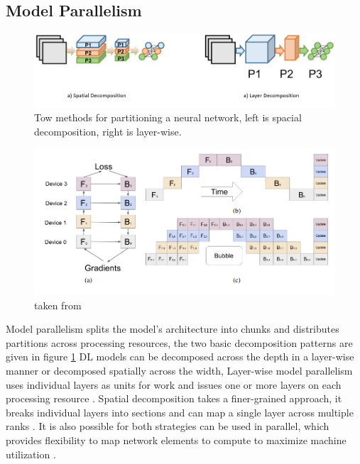 \subsection{Model Parallelism}
\begin{figure}
    \centering
    \includegraphics[width=15cm]{3_Chapters/3_Chapter_DistributedDL/Figs/model_parallel_decomposition_v2.png}
    \caption{Tow methods for partitioning a neural network, left is spacial decomposition, right is layer-wise.}
    \label{fig:model-parallel-decomposition}
\end{figure}

\begin{figure}
    \centering
    \includegraphics[width=15cm]{3_Chapters/3_Chapter_DistributedDL/Figs/layer_decomposition_bubble_gpipe.png}
    \caption{taken from \cite{Huang2019Gpipe}}
    \label{fig:layer_decomp_bubble}
\end{figure}

Model parallelism splits the model's architecture into chunks and distributes partitions across processing resources, the two basic decomposition patterns are given in figure \ref{fig:model-parallel-decomposition}
DL models can be decomposed across the depth in a layer-wise manner or decomposed spatially across the width,  
Layer-wise model parallelism uses individual layers as units for work and issues one or more layers on each processing resource \cite{Abadi2015TensorflowWhitepaper}. 
Spatial decomposition takes a finer-grained approach, it breaks individual layers into sections and can map a single layer across multiple ranks \cite{VanEssen2015LBANN}.
It is also possible for both strategies can be used in parallel, which provides flexibility to map network elements to compute to maximize machine utilization \cite{Dean2012DistBelif}.


